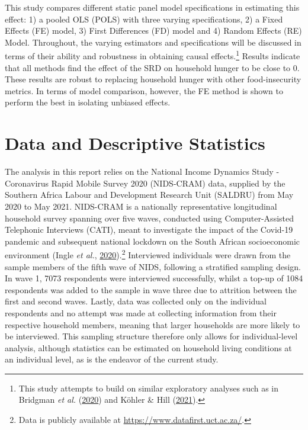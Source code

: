 \documentclass[11pt,preprint, authoryear]{elsarticle}
\numberwithin{equation}{section}
\numberwithin{figure}{section}
\numberwithin{table}{section}
\let\rmarkdownfootnote\footnote%
\def\footnote{\protect\rmarkdownfootnote}
\begin{document}
This study compares different static panel model specifications in
estimating this effect: 1) a pooled OLS (POLS) with three varying
specifications, 2) a Fixed Effects (FE) model, 3) First Differences (FD)
model and 4) Random Effects (RE) Model. Throughout, the varying
estimators and specifications will be discussed in terms of their
ability and robustness in obtaining causal effects.\footnote{This study
  attempts to build on similar exploratory analyses such as in Bridgman
  \emph{et al.} (\protect\hyperlink{ref-bridgman2020hunger}{2020}) and
  Köhler \& Hill (\protect\hyperlink{ref-kohler2021distribution}{2021}).}
Results indicate that all methods find the effect of the SRD on
household hunger to be close to 0. These results are robust to replacing
household hunger with other food-insecurity metrics. In terms of model
comparison, however, the FE method is shown to perform the best in
isolating unbiased effects.

\hypertarget{data-and-descriptive-statistics}{%
\section{\texorpdfstring{Data and Descriptive Statistics
\label{Data}}{Data and Descriptive Statistics }}\label{data-and-descriptive-statistics}}

The analysis in this report relies on the National Income Dynamics Study
- Coronavirus Rapid Mobile Survey 2020 (NIDS-CRAM) data, supplied by the
Southern Africa Labour and Development Research Unit (SALDRU) from May
2020 to May 2021. NIDS-CRAM is a nationally representative longitudinal
household survey spanning over five waves, conducted using
Computer-Assisted Telephonic Interviews (CATI), meant to investigate the
impact of the Covid-19 pandemic and subsequent national lockdown on the
South African socioeconomic environment (Ingle \emph{et al.},
\protect\hyperlink{ref-nids2020}{2020}).\footnote{Data is publicly
  available at \url{https://www.datafirst.uct.ac.za/}.} Interviewed
individuals were drawn from the sample members of the fifth wave of
NIDS, following a stratified sampling design. In wave 1, 7073
respondents were interviewed successfully, whilst a top-up of 1084
respondents was added to the sample in wave three due to attrition
between the first and second waves. Lastly, data was collected only on
the individual respondents and no attempt was made at collecting
information from their respective household members, meaning that larger
households are more likely to be interviewed. This sampling structure
therefore only allows for individual-level analysis, although statistics
can be estimated on household living conditions at an individual level,
as is the endeavor of the current study.
\end{document}
